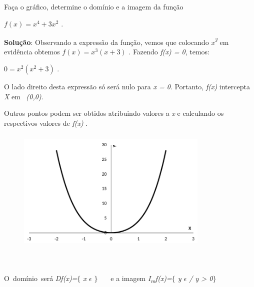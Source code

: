 \begin{texemplo}

Faça o gráfico, determine o domínio e a imagem da função 

\quad  \( f \left( x \right) =x^{4}+3x^{2} \) .

\begin{justify}
\textbf{Solução}: Observando a expressão da função, vemos que colocando \textit{x\textsuperscript{3}} em evidência obtemos  \( f \left( x \right) =x^{3} \left( x+3 \right)  \) . Fazendo \textit{f(x) = 0}, temos: 
\end{justify}

\begin{justify}
\quad  \( 0=x^{2} \left( x^{2}+3 \right)  \) .  
\end{justify}

O lado direito desta expressão só será nulo para \textit{x = 0}. Portanto, \textit{f(x)} intercepta \textit{X} em~ \textit{(0,0)}. 

Outros pontos podem ser obtidos atribuindo valores a \textit{x} e calculando os respectivos valores de \textit{f(x)} .

\begin{figure}[H]
	\begin{Center}
		\includegraphics[width=3.61in,height=2.35in]{capitulos/outras_funcoes/media/image20.pdf}
	\end{Center}
\end{figure}

~~

O~domínio~será   \textit{Df(x)=$ \{ $ x $ \epsilon $  \textbf{ }$ \} $ }~~~e a imagem  \textit{I\textsubscript{m}f(x)=$ \{ $ y $ \epsilon $  \textbf{ }/ y > 0$ \} $ }~ \qedsymbol{}
\end{texemplo}

